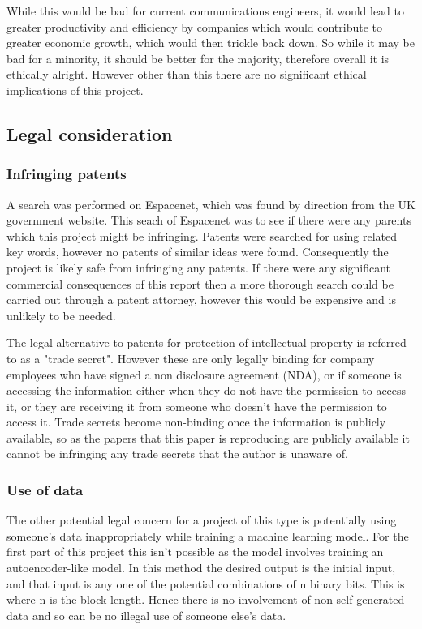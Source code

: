 \documentclass[12pt,onecolumn,letterpaper]{article}
\begin{document}
While this would be bad for current communications engineers, it would lead to greater productivity and efficiency by companies which would contribute to greater economic growth, which would then trickle back down. So while it may be bad for a minority, it should be better for the majority, therefore overall it is ethically alright. However other than this there are no significant ethical implications of this project.

\subsection{Legal consideration}

\subsubsection{Infringing patents}

A search was performed on Espacenet, which was found by direction from the UK government website. This seach of Espacenet was to see if there were any parents which this project might be infringing. Patents were searched for using related key words, however no patents of similar ideas were found. Consequently the project is likely safe from infringing any patents. If there were any significant commercial consequences of this report then a more thorough search could be carried out through a patent attorney, however this would be expensive and is unlikely to be needed.

The legal alternative to patents for protection of intellectual property is referred to as a "trade secret". However these are only legally binding for company employees who have signed a non disclosure agreement (NDA), or if someone is accessing the information either when they do not have the permission to access it, or they are receiving it from someone who doesn't have the permission to access it. Trade secrets become non-binding once the information is publicly available, so as the papers that this paper is reproducing are publicly available it cannot be infringing any trade secrets that the author is unaware of. 

\subsubsection{Use of data}

The other potential legal concern for a project of this type is potentially using someone's data inappropriately while training a machine learning model. For the first part of this project this isn't possible as the model involves training an autoencoder-like model. In this method the desired output is the initial input, and that input is any one of the potential combinations of n binary bits. This is where n is the block length. Hence there is no involvement of non-self-generated data and so can be no illegal use of someone else's data.
\end{document}
